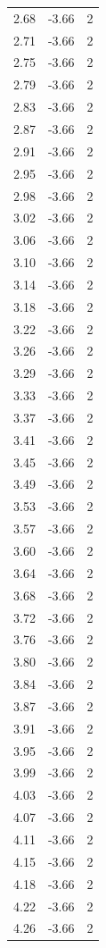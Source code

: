 \begin{longtable}{lrr}
  2.68 & -3.66 & 2 \\
  2.71 & -3.66 & 2 \\
  2.75 & -3.66 & 2 \\
  2.79 & -3.66 & 2 \\
  2.83 & -3.66 & 2 \\
  2.87 & -3.66 & 2 \\
  2.91 & -3.66 & 2 \\
  2.95 & -3.66 & 2 \\
  2.98 & -3.66 & 2 \\
  3.02 & -3.66 & 2 \\
  3.06 & -3.66 & 2 \\
  3.10 & -3.66 & 2 \\
  3.14 & -3.66 & 2 \\
  3.18 & -3.66 & 2 \\
  3.22 & -3.66 & 2 \\
  3.26 & -3.66 & 2 \\
  3.29 & -3.66 & 2 \\
  3.33 & -3.66 & 2 \\
  3.37 & -3.66 & 2 \\
  3.41 & -3.66 & 2 \\
  3.45 & -3.66 & 2 \\
  3.49 & -3.66 & 2 \\
  3.53 & -3.66 & 2 \\
  3.57 & -3.66 & 2 \\
  3.60 & -3.66 & 2 \\
  3.64 & -3.66 & 2 \\
  3.68 & -3.66 & 2 \\
  3.72 & -3.66 & 2 \\
  3.76 & -3.66 & 2 \\
  3.80 & -3.66 & 2 \\
  3.84 & -3.66 & 2 \\
  3.87 & -3.66 & 2 \\
  3.91 & -3.66 & 2 \\
  3.95 & -3.66 & 2 \\
  3.99 & -3.66 & 2 \\
  4.03 & -3.66 & 2 \\
  4.07 & -3.66 & 2 \\
  4.11 & -3.66 & 2 \\
  4.15 & -3.66 & 2 \\
  4.18 & -3.66 & 2 \\
  4.22 & -3.66 & 2 \\
  4.26 & -3.66 & 2 \\

\end{longtable}

